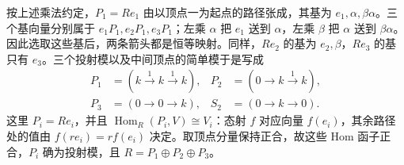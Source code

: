 \ProseParagraphBreak
按上述乘法约定，\(P_1=Re_1\) 由以顶点一为起点的路径张成，其基为 \(e_1,\alpha,\beta\alpha\)。三个基向量分别属于 \(e_1P_1,e_2P_1,e_3P_1\)；左乘 \(\alpha\) 把 \(e_1\) 送到 \(\alpha\)，左乘 \(\beta\) 把 \(\alpha\) 送到 \(\beta\alpha\)。因此选取这些基后，两条箭头都是恒等映射。同样，\(Re_2\) 的基为 \(e_2,\beta\)，\(Re_3\) 的基只有 \(e_3\)。三个投射模以及中间顶点的简单模于是写成
\[
	\begin{aligned}
		P_1&=(k\xrightarrow{1}k\xrightarrow{1}k),& P_2&=(0\longrightarrow k\xrightarrow{1}k),\\
		P_3&=(0\longrightarrow0\longrightarrow k),& S_2&=(0\longrightarrow k\longrightarrow0).
	\end{aligned}
\]
这里 \(P_i=Re_i\)，并且 \(\operatorname{Hom}_R(P_i,V)\cong V_i\)：态射 \(f\) 对应向量 \(f(e_i)\)，其余路径处的值由 \(f(re_i)=r f(e_i)\) 决定。取顶点分量保持正合，故这些 Hom 函子正合，\(P_i\) 确为投射模，且 \(R=P_1\oplus P_2\oplus P_3\)。

